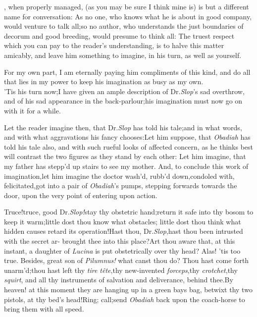 \documentclass{article}
\begin{document}
, when properly managed, (as
you may be sure I think mine is) is but a different name for
conversation: As no one, who knows what he is about in good
company, would venture to talk all;\tsk so no author, who
understands the just boundaries of decorum and good breeding, would
presume to think all: The truest respect which you can pay to the
reader’s understanding, is to halve this matter amicably, and
leave him something to imagine, in his turn,\break
as well as yourself.

For my own part, I am eternally paying him compliments of this
kind, and do all that lies in my power to keep his\break
imagination as busy as my own.\\
\newpage
’Tis his turn now;\tsk I have given an ample description of Dr.\@ \textit{Slop}’s sad
overthrow, and of his sad appearance in the back-parlour;\tsk his
imagination must now go on with it for a while.

Let the reader imagine then, that Dr.\@ \textit{Slop} has told his
tale;\tsk and in what words, and with what aggravations his fancy
chooses:\tsk Let him suppose, that \textit{Obadiah} has told his
tale also, and with such rueful looks of affected concern, as he
thinks best will contrast the two\break
figures as they stand by each other:\tsk\break
Let him imagine, that my father has\break
stepp’d up stairs to see my mother.\tsk\break 
And, to conclude this work of imagination,\tsk let him
imagine the doctor wash’d,\break
\tsk rubb’d down,\tsk condoled with,\tsk\break
felicitated,\tsk got into a pair of \textit{Obadiah}’s\break
pumps, stepping forwards towards the
door, upon the very point of entering\break
upon action.

Truce!\tsk truce, good Dr.\@ \textit{Slop!}\tsk stay thy
obstetric hand;\tsk return it safe into thy bosom to keep
it warm;\tsk little dost thou know what obstacles;\tsk
little dost thou think what hidden causes retard its
operation!\tsk Hast thou, Dr.\@ \textit{Slop},\tsk hast thou
been intrusted with the secret ar-\break
{} 
brought thee into this place?\tsk Art thou aware
that, at this instant, a daughter of \textit{Lucina} is put
obstetrically over thy head?\break
Alas! ’tis too true.\tsk
Besides, great son of \textit{Pilumnus!} what canst thou
do?\tsh\break
Thou hast come forth unarm’d;\tsk thou hast left thy
\textit{tire tête},\tsk thy new-invented
\textit{forceps},\tsk thy \textit{crotchet},\tsk thy
\textit{squirt}, and all thy instruments of salvation and
deliverance, behind thee.\tsk By heaven!
at this moment they are hanging up in a green bays bag,
betwixt thy two pistols, at thy bed’s head!\tsk Ring;\tsk
call;\tsk send \textit{Obadiah} back upon the coach-horse to
bring them with all speed.
\end{document}
